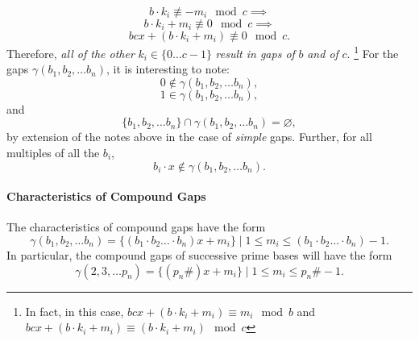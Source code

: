 \documentclass{article}
\begin{document}
	\begin{equation*} b \cdot k_i \not \equiv -m_i \mod c \implies\end{equation*}
	\begin{equation*} b \cdot k_i  + m_i \not \equiv 0 \mod c \implies \end{equation*}
	\begin{equation*} bcx + (b \cdot k_i  + m_i) \not \equiv 0 \mod c. \end{equation*}
Therefore, \emph{all of the other} $k_i \in \{ 0 \ldots c-1 \}$ \emph{result in gaps of} $b$ \emph{and of} $c$. \footnote{In fact, in this case,
	$ bcx + (b \cdot k_i  + m_i) \equiv m_i \mod b$ and $ bcx + (b \cdot k_i  + m_i) \equiv (b \cdot k_i  + m_i) \mod c$} For the gaps $\gamma(b_1, b_2, \dots b_n)$, it is interesting to note:
	\begin{equation*}0 \notin \gamma(b_1, b_2, \dots b_n), \end{equation*}
	\begin{equation*}1 \in \gamma(b_1, b_2, \dots b_n), \end{equation*}
and
	\begin{equation*}\{ b_1, b_2, \ldots b_n \} \cap \gamma(b_1, b_2, \dots b_n) = \varnothing, \end{equation*}	
by extension of the notes above in the case of \emph{simple} gaps. Further, for all multiples of all the $b_i$,
	\begin{equation*}b_i \cdot x \not \in \gamma(b_1, b_2, \ldots b_n). \end{equation*}	

\paragraph{Characteristics of Compound Gaps}	The characteristics of compound gaps have the form
	\begin{equation*} \gamma(b_1, b_2, \ldots b_n) = \{ (b_1 \cdot b_2 \ldots \cdot b_n)x + m_i \} \mid 1 \leq m_i \leq (b_1 \cdot b_2 \ldots \cdot b_n)-1.\end{equation*}
In particular, the compound gaps of successive prime bases will have the form
	\begin{equation*} \gamma(2, 3, \ldots p_n) = \{ (p_n\#)x + m_i \} \mid 1 \leq m_i \leq p_n\#-1.\end{equation*}
\end{document}
